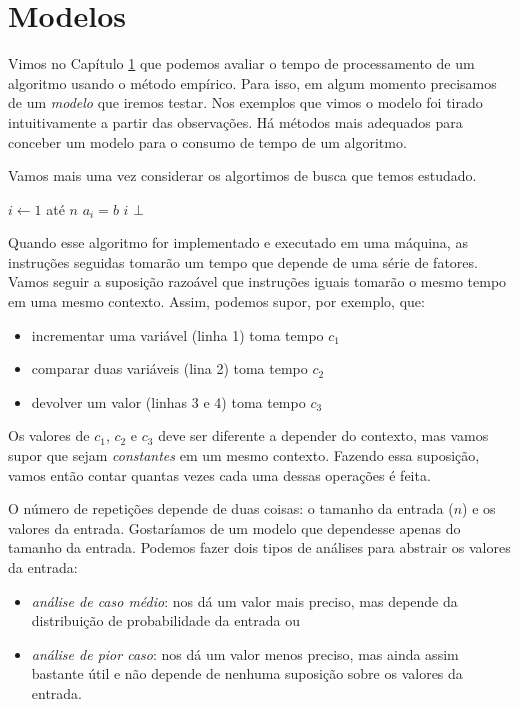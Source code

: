\chapter{Modelos}

Vimos no Capítulo \ref{} que podemos avaliar o tempo de processamento de um algoritmo usando o método empírico.
Para isso, em algum momento precisamos de um {\em modelo} que iremos testar.
Nos exemplos que vimos o modelo foi tirado intuitivamente a partir das observações.
Há métodos mais adequados para conceber um modelo para o consumo de tempo de um algoritmo.

Vamos mais uma vez considerar os algortimos de busca que temos estudado.

\begin{codebox}
\li \For $i \gets 1$ até $n$
\li \Do \If $a_i = b$
\li     \Then \Return $i$
        \End
    \End
\li \Return $\bot$
\End
\end{codebox}

Quando esse algoritmo for implementado e executado em uma máquina, as instruções seguidas tomarão um tempo que depende de uma série de fatores.
Vamos seguir a suposição razoável que instruções iguais tomarão o mesmo tempo em uma mesmo contexto.
Assim, podemos supor, por exemplo, que:
\begin{itemize}
\item incrementar uma variável (linha 1) toma tempo $c_1$
\item comparar duas variáveis (lina 2) toma tempo $c_2$
\item devolver um valor (linhas 3 e 4) toma tempo $c_3$
\end{itemize}

Os valores de $c_1$, $c_2$ e $c_3$ deve ser diferente a depender do contexto, mas vamos supor que sejam {\em constantes} em um mesmo contexto.
Fazendo essa suposição, vamos então contar quantas vezes cada uma dessas operações é feita.

O número de repetições depende de duas coisas: o tamanho da entrada ($n$) e os valores da entrada.
Gostaríamos de um modelo que dependesse apenas do tamanho da entrada.
Podemos fazer dois tipos de análises para abstrair os valores da entrada:
\begin{itemize}
\item {\em análise de caso médio}: nos dá um valor mais preciso, mas depende da distribuição de probabilidade da entrada ou
  \item {\em análise de pior caso}: nos dá um valor menos preciso, mas ainda assim bastante útil e não depende de nenhuma suposição sobre os valores da entrada.
  \end{itemize}

